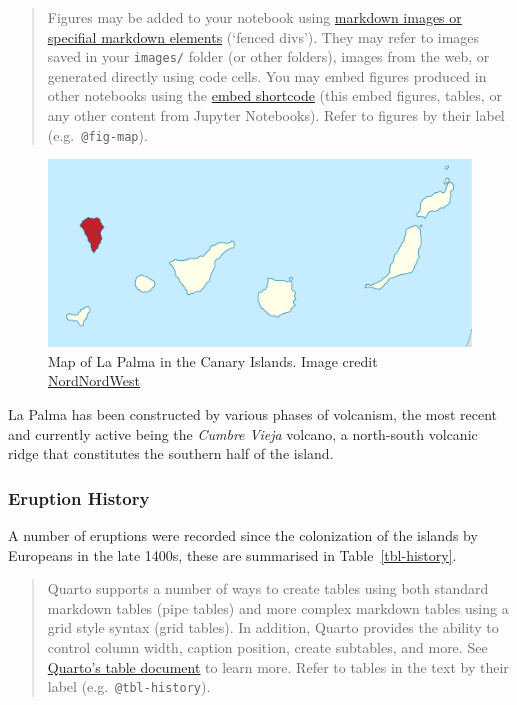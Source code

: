 \documentclass[
]{agujournal2019}
\begin{document}
\begin{quote}
Figures may be added to your notebook using
\href{https://quarto.org/docs/authoring/figures.html}{markdown images or
specifial markdown elements} (`fenced divs'). They may refer to images
saved in your \texttt{images/} folder (or other folders), images from
the web, or generated directly using code cells. You may embed figures
produced in other notebooks using the
\href{https://quarto.org/docs/authoring/notebook-embed.html}{embed
shortcode} (this embed figures, tables, or any other content from
Jupyter Notebooks). Refer to figures by their label
(e.g.~\texttt{@fig-map}).
\end{quote}

\begin{figure}

{\centering \includegraphics[width=1\textwidth,height=\textheight]{images/la-palma-map.png}

}

\caption{\label{fig-map}Map of La Palma in the Canary Islands. Image
credit
\href{https://commons.wikimedia.org/w/index.php?curid=76638603}{NordNordWest}}

\end{figure}

La Palma has been constructed by various phases of volcanism, the most
recent and currently active being the \emph{Cumbre Vieja} volcano, a
north-south volcanic ridge that constitutes the southern half of the
island.

\subsubsection{Eruption History}\label{eruption-history}

A number of eruptions were recorded since the colonization of the
islands by Europeans in the late 1400s, these are summarised in
Table~\ref{tbl-history}.

\begin{quote}
Quarto supports a number of ways to create tables using both standard
markdown tables (pipe tables) and more complex markdown tables using a
grid style syntax (grid tables). In addition, Quarto provides the
ability to control column width, caption position, create subtables, and
more. See \href{https://quarto.org/docs/authoring/tables.html}{Quarto's
table document} to learn more. Refer to tables in the text by their
label (e.g.~\texttt{@tbl-history}).
\end{quote}
\end{document}
